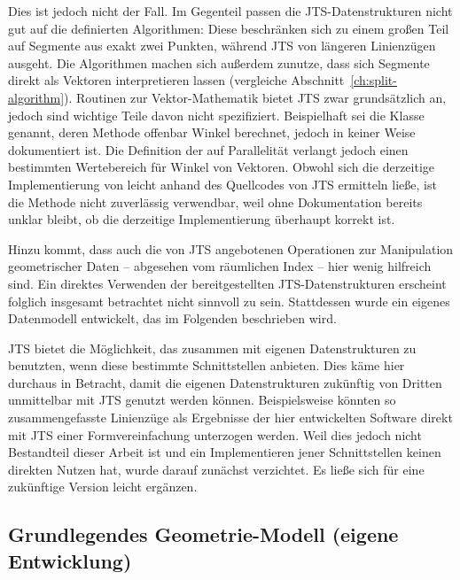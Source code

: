 \documentclass[../main/thesis.tex]{subfiles}
\begin{document}
Dies ist jedoch nicht der Fall.
Im Gegenteil passen die JTS-Datenstrukturen nicht gut auf die definierten Algorithmen:
Diese beschränken sich zu einem großen Teil auf Segmente aus exakt zwei Punkten, während JTS von längeren Linienzügen ausgeht.
Die Algorithmen machen sich außerdem zunutze, dass sich Segmente direkt als Vektoren interpretieren lassen (vergleiche Abschnitt~\ref{ch:split-algorithm}).
Routinen zur Vektor-Mathematik bietet JTS zwar grundsätzlich an, jedoch sind wichtige Teile davon nicht spezifiziert.
Beispielhaft sei die Klasse  genannt, deren Methode  offenbar Winkel berechnet, jedoch in keiner Weise dokumentiert ist.
Die Definition der  auf Parallelität verlangt jedoch einen bestimmten Wertebereich für Winkel von Vektoren.
Obwohl sich die derzeitige Implementierung von  leicht anhand des Quellcodes von JTS ermitteln ließe, ist die Methode nicht zuverlässig verwendbar, weil ohne Dokumentation bereits unklar bleibt, ob die derzeitige Implementierung überhaupt korrekt ist.

Hinzu kommt, dass auch die von JTS angebotenen Operationen zur Manipulation geometrischer Daten -- abgesehen vom räumlichen Index -- hier wenig hilfreich sind.
Ein direktes Verwenden der bereitgestellten JTS-Datenstrukturen erscheint folglich insgesamt betrachtet nicht sinnvoll zu sein.
Stattdessen wurde ein eigenes Datenmodell entwickelt, das im Folgenden beschrieben wird.

JTS bietet die Möglichkeit, das  zusammen mit eigenen Datenstrukturen zu benutzten, wenn diese bestimmte Schnittstellen anbieten.
Dies käme hier durchaus in Betracht, damit die eigenen Datenstrukturen zukünftig von Dritten unmittelbar mit JTS genutzt werden können.
Beispielsweise könnten so zusammengefasste Linienzüge als Ergebnisse der hier entwickelten Software direkt mit JTS einer Formvereinfachung unterzogen werden.
Weil dies jedoch nicht Bestandteil dieser Arbeit ist und ein Implementieren jener Schnittstellen keinen direkten Nutzen hat, wurde darauf zunächst verzichtet.
Es ließe sich für eine zukünftige Version leicht ergänzen.



\subsection{Grundlegendes Geometrie-Modell (eigene Entwicklung)}
\end{document}
